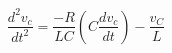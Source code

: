 \documentclass[preview]{standalone}
\begin{document}
\begin{center}
\[ \frac{d^2v_c}{dt^2} = \frac{-R}{LC} \left( C \frac{dv_c}{dt} \right) - \frac{v_C}{L} \]
\end{center}
\end{document}

